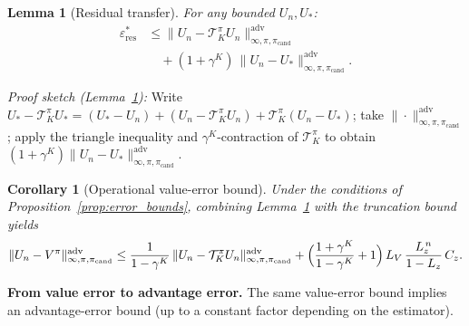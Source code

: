 \documentclass{article}
\theoremstyle{plain}
\newtheorem{lemma}[theorem]{Lemma}
\newtheorem{corollary}[theorem]{Corollary}
\theoremstyle{definition}
\theoremstyle{remark}
\newcommand{\shortonly}[1]{#1}
\newcommand{\shortonly}[1]{}
\begin{document}
\begin{lemma}[Residual transfer]
\label{lem:residual_transfer}
For any bounded $U_n,U_*$:
\begin{equation}
\begin{split}
\varepsilon_{\mathrm{res}}^*
&\le
\|U_n - \mathcal{T}^\pi_K U_n\|_{\infty,\pi,\pi_{\mathrm{cand}}}^{\mathrm{adv}} \\
&\quad +
(1+\gamma^K)\,\|U_n-U_*\|_{\infty,\pi,\pi_{\mathrm{cand}}}^{\mathrm{adv}}.
\end{split}
\end{equation}
\end{lemma}

\emph{Proof sketch (Lemma~\ref{lem:residual_transfer}):}
Write $U_*-\mathcal{T}^\pi_K U_* = (U_*-U_n)+(U_n-\mathcal{T}^\pi_K U_n)+\mathcal{T}^\pi_K(U_n-U_*)$;
take $\|\cdot\|_{\infty,\pi,\pi_{\mathrm{cand}}}^{\mathrm{adv}}$; apply the triangle inequality and $\gamma^K$-contraction of $\mathcal{T}^\pi_K$ to obtain $(1+\gamma^K)\|U_n-U_*\|_{\infty,\pi,\pi_{\mathrm{cand}}}^{\mathrm{adv}}$.

\begin{corollary}[Operational value-error bound]
\label{cor:operational_value_error}
Under the conditions of Proposition~\ref{prop:error_bounds}, combining Lemma~\ref{lem:residual_transfer} with the truncation bound yields
\[
  \|U_n - V^\pi\|_{\infty,\pi,\pi_{\mathrm{cand}}}^{\mathrm{adv}}
  \le
  \frac{1}{1-\gamma^K}\,
  \|U_n-\mathcal{T}^\pi_K U_n\|_{\infty,\pi,\pi_{\mathrm{cand}}}^{\mathrm{adv}}
  +
  \Bigl(\frac{1+\gamma^K}{1-\gamma^K}+1\Bigr)\,
  L_V\,\frac{L_z^{\,n}}{1-L_z}\,C_z.
\]
\end{corollary}

\shortonly{
\textbf{From value error to advantage error.}
The same value-error bound implies an advantage-error bound (up to a constant factor depending on the estimator).}
\end{document}
